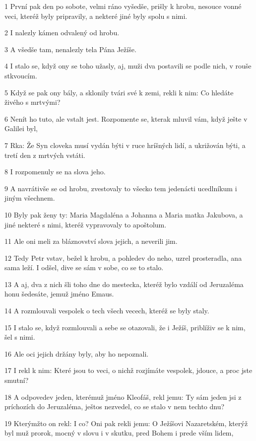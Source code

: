\par 1 První pak den po sobote, velmi ráno vyšedše, prišly k hrobu, nesouce vonné veci, kteréž byly pripravily, a nekteré jiné byly spolu s nimi.
\par 2 I nalezly kámen odvalený od hrobu.
\par 3 A všedše tam, nenalezly tela Pána Ježíše.
\par 4 I stalo se, když ony se toho užasly, aj, muži dva postavili se podle nich, v rouše stkvoucím.
\par 5 Když se pak ony bály, a sklonily tvári své k zemi, rekli k nim: Co hledáte živého s mrtvými?
\par 6 Nenít ho tuto, ale vstalt jest. Rozpomente se, kterak mluvil vám, když ješte v Galilei byl,
\par 7 Rka: Že Syn cloveka musí vydán býti v ruce hríšných lidí, a ukrižován býti, a tretí den z mrtvých vstáti.
\par 8 I rozpomenuly se na slova jeho.
\par 9 A navrátivše se od hrobu, zvestovaly to všecko tem jedenácti ucedlníkum i jiným všechnem.
\par 10 Byly pak ženy ty: Maria Magdaléna a Johanna a Maria matka Jakubova, a jiné nekteré s nimi, kteréž vypravovaly to apoštolum.
\par 11 Ale oni meli za bláznovství slova jejich, a neverili jim.
\par 12 Tedy Petr vstav, bežel k hrobu, a pohledev do neho, uzrel prosteradla, ana sama leží. I odšel, dive se sám v sobe, co se to stalo.
\par 13 A aj, dva z nich šli toho dne do mestecka, kteréž bylo vzdálí od Jeruzaléma honu šedesáte, jemuž jméno Emaus.
\par 14 A rozmlouvali vespolek o tech všech vecech, kteréž se byly staly.
\par 15 I stalo se, když rozmlouvali a sebe se otazovali, že i Ježíš, priblíživ se k nim, šel s nimi.
\par 16 Ale oci jejich držány byly, aby ho nepoznali.
\par 17 I rekl k nim: Které jsou to veci, o nichž rozjímáte vespolek, jdouce, a proc jste smutní?
\par 18 A odpovedev jeden, kterémuž jméno Kleofáš, rekl jemu: Ty sám jeden jsi z príchozích do Jeruzaléma, ještos nezvedel, co se stalo v nem techto dnu?
\par 19 Kterýmžto on rekl: I co? Oni pak rekli jemu: O Ježíšovi Nazaretském, kterýž byl muž prorok, mocný v slovu i v skutku, pred Bohem i prede vším lidem,
